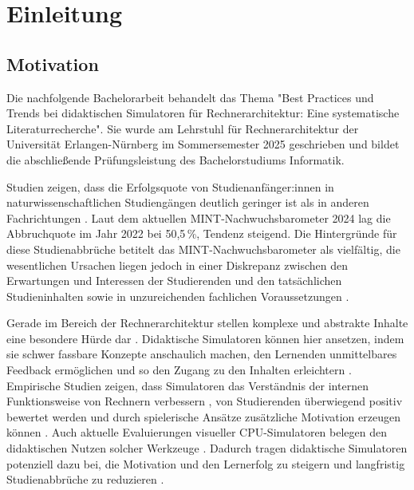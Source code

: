 \chapter{Einleitung}

\section{Motivation}

Die nachfolgende Bachelorarbeit behandelt das Thema "Best Practices und Trends bei didaktischen Simulatoren für Rechnerarchitektur: Eine systematische Literaturrecherche". Sie wurde am Lehrstuhl für Rechnerarchitektur der Universität Erlangen-Nürnberg im Sommersemester 2025 geschrieben und bildet die abschließende Prüfungsleistung des Bachelorstudiums Informatik.

Studien zeigen, dass die Erfolgsquote von Studienanfänger:innen in naturwissenschaftlichen Studiengängen deutlich geringer ist als in anderen Fachrichtungen \parencite[S.~370]{burdinski_lehrvideos_2024}. Laut dem aktuellen MINT-Nachwuchsbarometer 2024 lag die Abbruchquote im Jahr 2022 bei 50,5\,\%, Tendenz steigend. Die Hintergründe für diese Studienabbrüche betitelt das MINT-Nachwuchsbarometer als vielfältig, die wesentlichen Ursachen liegen jedoch in einer Diskrepanz zwischen den Erwartungen und Interessen der Studierenden und den tatsächlichen Studieninhalten sowie in unzureichenden fachlichen Voraussetzungen \parencite[S.~21]{joachim_herz_stiftung_mint_2024}.

Gerade im Bereich der Rechnerarchitektur stellen komplexe und abstrakte Inhalte eine besondere Hürde dar \parencite[S.~1]{grober_championship_2022}. Didaktische Simulatoren können hier ansetzen, indem sie schwer fassbare Konzepte anschaulich machen, den Lernenden unmittelbares Feedback ermöglichen und so den Zugang zu den Inhalten erleichtern \parencite[S.~11]{zeichner_using_2008}. Empirische Studien zeigen, dass Simulatoren das Verständnis der internen Funktionsweise von Rechnern verbessern \parencite[S.~215]{prasad_using_2015}, von Studierenden überwiegend positiv bewertet werden \parencite[S.~8]{besim_understanding_2012} und durch spielerische Ansätze zusätzliche Motivation erzeugen können \parencite[S.~453]{schlag_gamifizierung_2021}. Auch aktuelle Evaluierungen visueller CPU-Simulatoren belegen den didaktischen Nutzen solcher Werkzeuge \parencites[S.~11]{maxnuck_soares_use_2016}[S.~75]{cortinovis_further_2024}. Dadurch tragen didaktische Simulatoren potenziell dazu bei, die Motivation und den Lernerfolg zu steigern und langfristig Studienabbrüche zu reduzieren \parencite[S.~272]{kornelsen_expedition_2005}.

